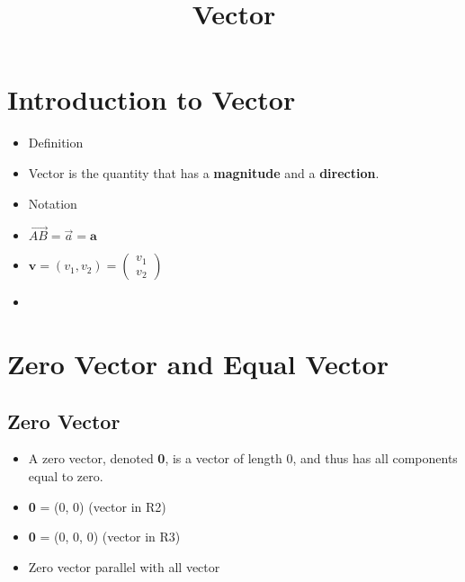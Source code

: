 \documentclass[a4paper,12pt]{article}
\begin{document}
\title{Vector}

\section*{Introduction to Vector}
\begin{itemize}
  \item Definition
  \item[] Vector is the quantity that has a \textbf{magnitude} and a \textbf{direction}.
  \item Notation
  \item[] $\overrightarrow{AB} = \overrightarrow{a} = \textbf{a} $
  \item[] $\textbf{v} = (v_1, v_2) = \begin{pmatrix} v_1 \\ v_2 \end{pmatrix} $
  \item[] 
\end{itemize}

\section*{Zero Vector and Equal Vector}

\subsection*{Zero Vector}
\begin{itemize}
  \item A zero vector, denoted \textbf{0}, is a vector of length 0, and thus has all components equal to zero.
  \item[] \textbf{0} = (0, 0) (vector in R2)
  \item[] \textbf{0} = (0, 0, 0) (vector in R3)
  \item Zero vector parallel with all vector
\end{itemize}
\end{document}
